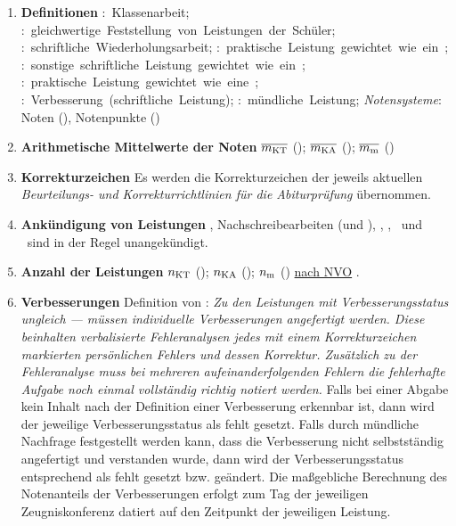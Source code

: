 \begin{enumerate}[label=\textbf{(\arabic*)}, align=left, leftmargin=*]
	\item \textbf{Definitionen} { \scriptsize \mbox{\textbf{}: Klassenarbeit}; \mbox{\textbf{}: gleichwertige Feststellung von Leistungen der Schüler}; \mbox{\textbf{}: schriftliche Wiederholungsarbeit};  \linebreak \mbox{\textbf{}: praktische Leistung gewichtet wie ein }; \mbox{\textbf{}: sonstige schriftliche Leistung gewichtet wie ein }; \mbox{\textbf{}: praktische Leistung gewichtet wie eine }; \linebreak \mbox{\textbf{}: Verbesserung (schriftliche Leistung)};  \mbox{\textbf{}: mündliche Leistung}; \textit{Notensysteme}: Noten (\textbf{}), Notenpunkte (\textbf{}) }
	\item \textbf{Arithmetische Mittelwerte der Noten}  { \scriptsize $\overline{m_{\mathrm{KT}}}$ (\catkt); $\overline{m_{\mathrm{KA}}}$ (\catka); $\overline{m_{\mathrm{m}}}$ (\catm) }
	\item \textbf{Korrekturzeichen} { \scriptsize  Es werden die Korrekturzeichen der jeweils aktuellen \textit{\glqq Beurteilungs- und Korrekturrichtlinien für die Abiturprüfung\grqq{}} übernommen. }
	\item \textbf{Ankündigung von Leistungen} { \scriptsize {}, Nachschreibearbeiten ( und ), , , ~und ~sind in der Regel unangekündigt.}
	\item \textbf{Anzahl der Leistungen} { \scriptsize $n_{\mathrm{KT}}$ (\catkt); $n_{\mathrm{KA}}$ (\catka); $n_{\mathrm{m}}$ (\catm) \href{\nvourl}{nach NVO} \cite{nvo}}.
	\item \textbf{Verbesserungen} { \scriptsize Definition von : \glqq\textit{Zu den Leistungen mit Verbesserungsstatus ungleich \glqq ---\grqq{} müssen \textit{individuelle} Verbesserungen angefertigt werden. Diese beinhalten verbalisierte Fehleranalysen jedes mit einem Korrekturzeichen markierten \textit{persönlichen} Fehlers und dessen Korrektur. Zusätzlich zu der Fehleranalyse muss bei mehreren aufeinanderfolgenden Fehlern die fehlerhafte Aufgabe noch einmal vollständig richtig notiert werden.}\grqq{} Falls bei einer Abgabe kein Inhalt nach der Definition einer Verbesserung erkennbar ist, dann wird der jeweilige Verbesserungsstatus als \glqq fehlt\grqq{} gesetzt.  Falls durch mündliche Nachfrage festgestellt werden kann, dass die Verbesserung nicht selbstständig angefertigt und verstanden wurde, dann wird der Verbesserungsstatus entsprechend als \glqq fehlt\grqq{} gesetzt bzw. geändert. Die maßgebliche Berechnung des Notenanteils der Verbesserungen erfolgt zum Tag der jeweiligen Zeugniskonferenz datiert auf den Zeitpunkt der jeweiligen Leistung.}

\end{enumerate}
